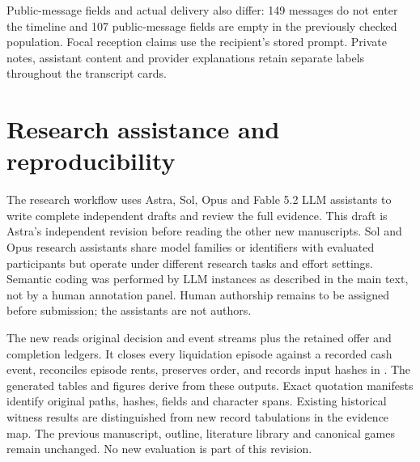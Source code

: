 Public-message fields and actual delivery also differ: 149 messages do not enter the timeline and 107 public-message fields are empty in the previously checked population. Focal reception claims use the recipient's stored prompt. Private notes, assistant content and provider explanations retain separate labels throughout the transcript cards.

\section{Research assistance and reproducibility}
\label{app:provenance}

The research workflow uses Astra, Sol, Opus and Fable 5.2 LLM assistants to write complete independent drafts and review the full evidence. This draft is Astra's independent revision before reading the other new manuscripts. Sol and Opus research assistants share model families or identifiers with evaluated participants but operate under different research tasks and effort settings. Semantic coding was performed by LLM instances as described in the main text, not by a human annotation panel. Human authorship remains to be assigned before submission; the assistants are not authors.

The new  reads original decision and event streams plus the retained offer and completion ledgers. It closes every liquidation episode against a recorded cash event, reconciles episode rents, preserves order, and records input hashes in . The generated tables and figures derive from these outputs. Exact quotation manifests identify original paths, hashes, fields and character spans. Existing historical witness results are distinguished from new record tabulations in the evidence map. The previous manuscript, outline, literature library and canonical games remain unchanged. No new evaluation is part of this revision.
